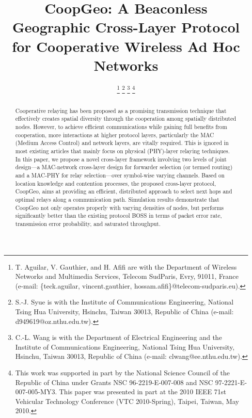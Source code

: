 \documentclass[journal,twoside,final]{IEEEtran}
\begin{document}
\title{CoopGeo: A Beaconless Geographic Cross-Layer Protocol for Cooperative Wireless Ad Hoc Networks}

\author{

\thanks{
T. Aguilar, V. Gauthier, and H. Afifi are with the Department of Wireless Networks and Multimedia Services, Telecom SudParis, Evry, 91011, France (e-mail: \{teck.aguilar, vincent.gauthier, hossam.afifi\}@telecom-sudparis.eu).}
\thanks{
S.-J. Syue is with the Institute of Communications
Engineering, National Tsing Hua University, Hsinchu, Taiwan 30013,
Republic of China (e-mail: d949619@oz.nthu.edu.tw).}
\thanks{
C.-L. Wang is with the Department of Electrical Engineering
and the Institute of Communications Engineering, National Tsing
Hua University, Hsinchu, Taiwan 30013, Republic of China (e-mail: clwang@ee.nthu.edu.tw).}
\thanks{
This work was supported in part by the National Science Council of the Republic of China under Grants NSC 96-2219-E-007-008 and NSC 97-2221-E-007-005-MY3. This paper was presented in part at the 2010 IEEE 71st Vehicular Technology Conference (VTC 2010-Spring), Taipei, Taiwan, May 2010.}
}





\maketitle

\begin{abstract}
Cooperative relaying has been proposed as a promising transmission technique that effectively creates spatial diversity through the cooperation among spatially distributed nodes. However, to achieve efficient communications while gaining full benefits from cooperation, more interactions at higher protocol layers, particularly the MAC (Medium Access Control) and network layers, are vitally required. This is ignored in most existing articles that mainly focus on physical (PHY)-layer relaying techniques. In this paper, we propose a novel cross-layer framework involving two levels of joint design---a MAC-network cross-layer design for forwarder selection (or termed routing) and a MAC-PHY for relay selection---over symbol-wise varying channels. Based on location knowledge and contention processes, the proposed cross-layer protocol, CoopGeo, aims at providing an efficient, distributed approach to select next hops and optimal relays along a communication path. Simulation results demonstrate that CoopGeo not only operates properly with varying densities of nodes, but performs significantly better than the existing protocol BOSS in terms of packet error rate, transmission error probability, and saturated throughput.
\end{abstract}
\end{document}
